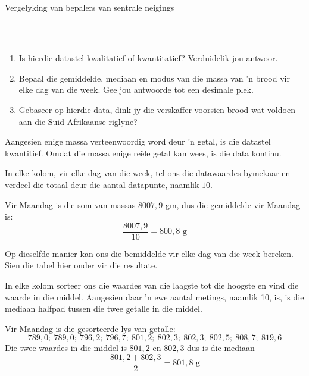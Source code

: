\begin{wex}{
Vergelyking van bepalers van sentrale neigings
}
{\begin{center}
\begin{tabular}{|c|c|c|c|c|c|c|}
      \end{tabular}
    \end{center}
\vspace{8pt}\\
    \begin{enumerate}[noitemsep, label=\textbf{\arabic*}.]
    \item Is hierdie datastel kwalitatief of kwantitatief? Verduidelik jou antwoor.
    \item Bepaal die gemiddelde, mediaan en modus van die massa van ’n brood vir elke dag van die week. Gee jou antwoorde tot een desimale plek.
    \item Gebaseer op hierdie data, dink jy die verskaffer voorsien brood wat voldoen aan die Suid-Afrikaanse riglyne?
    \end{enumerate}
}{

  Aangesien enige massa verteenwoordig word deur ’n getal, is die datastel kwantitief. Omdat die massa enige reële getal kan wees, is die data kontinu.


 In elke kolom, vir elke dag van die week, tel ons die datawaardes bymekaar en verdeel die totaal deur die aantal datapunte, naamlik $10$.

  Vir Maandag is die som van massas $8007,9$ gm, dus die gemiddelde vir Maandag is:
  \begin{equation*}
    \frac{8007,9}{10} = 800,8\mbox{ g}
  \end{equation*}

  Op dieselfde manier kan ons die bemiddelde vir elke dag van die week bereken. Sien die tabel hier onder vir die resultate.


  In elke kolom sorteer ons die waardes van die laagste tot die hoogste en vind die waarde in die middel. Aangesien daar ’n ewe aantal metings, naamlik 10, is, is die mediaan halfpad tussen die twee getalle in die middel.

  Vir Maandag is die gesorteerde lys van getalle:
  \begin{equation*}
    789,0;\ 789,0;\ 796,2;\ 796,7;\ 801,2;\ 802,3;\ 802,3;\ 802,5;\ 808,7;\ 819,6
  \end{equation*}
  Die twee waardes in die middel is $801,2$ en $802,3$ dus is die mediaan
  \begin{equation*}
    \frac{801,2 + 802,3}{2} = 801,8\mbox{ g}
  \end{equation*}

}
\end{wex}

